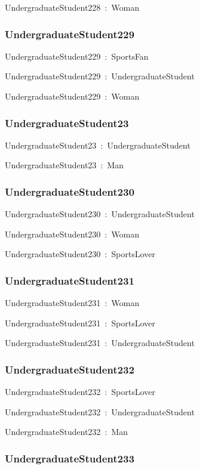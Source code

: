 \documentclass{article}
\begin{document}
UndergraduateStudent228~:~Woman

\subsubsection*{UndergraduateStudent229}

UndergraduateStudent229~:~SportsFan

UndergraduateStudent229~:~UndergraduateStudent

UndergraduateStudent229~:~Woman

\subsubsection*{UndergraduateStudent23}

UndergraduateStudent23~:~UndergraduateStudent

UndergraduateStudent23~:~Man

\subsubsection*{UndergraduateStudent230}

UndergraduateStudent230~:~UndergraduateStudent

UndergraduateStudent230~:~Woman

UndergraduateStudent230~:~SportsLover

\subsubsection*{UndergraduateStudent231}

UndergraduateStudent231~:~Woman

UndergraduateStudent231~:~SportsLover

UndergraduateStudent231~:~UndergraduateStudent

\subsubsection*{UndergraduateStudent232}

UndergraduateStudent232~:~SportsLover

UndergraduateStudent232~:~UndergraduateStudent

UndergraduateStudent232~:~Man

\subsubsection*{UndergraduateStudent233}
\end{document}
